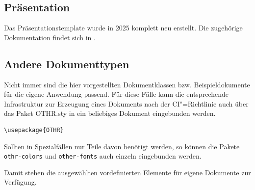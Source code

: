 \documentclass[
paper=a4,
DIV=11,
fontsize=12pt,
twoside=true,
parskip=half-,
department=FakS,
logostyle=flat
]{OTHRartcl}
\newcommand{\datei}[1]{{\ttfamily #1}}
\begin{document}
\subsection{Präsentation}

Das Präsentationstemplate wurde in 2025 komplett neu erstellt. Die zugehörige Dokumentation findet sich in \cite{othr-beamer}.

\subsection{Andere Dokumenttypen}

Nicht immer sind die hier vorgestellten Dokumentklassen bzw. Beispieldokumente für die eigene Anwendung passend.
Für diese Fälle kann die entsprechende Infrastruktur zur Erzeugung eines Dokuments nach der CI"=Richtlinie auch über das Paket \datei{OTHR.sty} in ein beliebiges Dokument eingebunden werden.

\begin{verbatim}
\usepackage{OTHR}
\end{verbatim}

Sollten in Spezialfällen nur Teile davon benötigt werden, so können die Pakete \texttt{othr-colors} und \texttt{other-fonts} auch einzeln eingebunden werden.

Damit stehen die ausgewählten vordefinierten Elemente für eigene Dokumente zur Verfügung.



\end{document}
